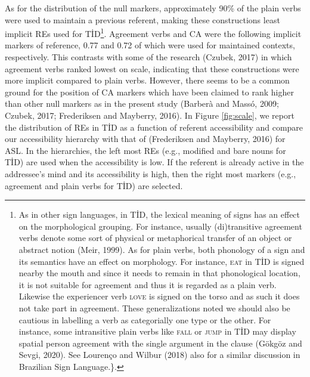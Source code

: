 \documentclass[]{elsarticle} %
\begin{document}
As for the distribution of the null markers, approximately 90\% of the
plain verbs were used to maintain a previous referent, making these
constructions least implicit REs used for TİD\footnote{As in other sign
  languages, in TİD, the lexical meaning of signs has an effect on the
  morphological grouping. For instance, usually (di)transitive agreement
  verbs denote some sort of physical or metaphorical transfer of an
  object or abstract notion (Meir, 1999). As for plain verbs, both
  phonology of a sign and its semantics have an effect on morphology.
  For instance, \textsc{eat} in TİD is signed nearby the mouth and since
  it needs to remain in that phonological location, it is not suitable
  for agreement and thus it is regarded as a plain verb. Likewise the
  experiencer verb \textsc{love} is signed on the torso and as such it
  does not take part in agreement. These generalizations noted we should
  also be cautious in labelling a verb as categorially one type or the
  other. For instance, some intransitive plain verbs like \textsc{fall}
  or \textsc{jump} in TİD may display spatial person agreement with the
  single argument in the clause (Gökgöz and Sevgi, 2020). See Lourenço
  and Wilbur (2018) also for a similar discussion in Brazilian Sign
  Language.\}.}. Agreement verbs and CA were the following implicit
markers of reference, 0.77 and 0.72 of which were used for maintained
contexts, respectively. This contrasts with some of the research
(Czubek, 2017) in which agreement verbs ranked lowest on scale,
indicating that these constructions were more implicit compared to plain
verbs. However, there seems to be a common ground for the position of CA
markers which have been claimed to rank higher than other null markers
as in the present study (Barberà and Massó, 2009; Czubek, 2017;
Frederiksen and Mayberry, 2016). In Figure \ref{fig:scale}, we report
the distribution of REs in TİD as a function of referent accessibility
and compare our accessibility hierarchy with that of (Frederiksen and
Mayberry, 2016) for ASL. In the hierarchies, the left most REs (e.g.,
modified and bare nouns for TİD) are used when the accessibility is low.
If the referent is already active in the addressee's mind and its
accessibility is high, then the right most markers (e.g., agreement and
plain verbs for TİD) are selected.
\end{document}
